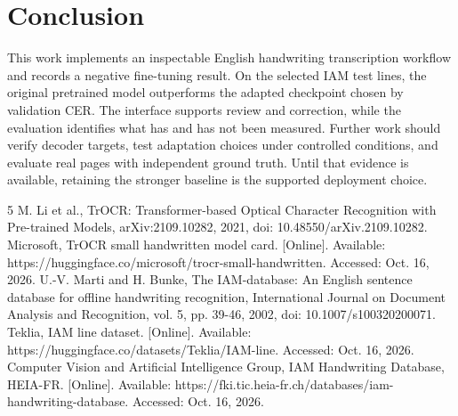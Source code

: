 \documentclass[conference]{IEEEtran}
\begin{document}
\section{Conclusion}
This work implements an inspectable English handwriting transcription workflow and records a negative fine-tuning result. On the selected IAM test lines, the original pretrained model outperforms the adapted checkpoint chosen by validation CER. The interface supports review and correction, while the evaluation identifies what has and has not been measured. Further work should verify decoder targets, test adaptation choices under controlled conditions, and evaluate real pages with independent ground truth. Until that evidence is available, retaining the stronger baseline is the supported deployment choice.
\begin{thebibliography}{5}
 M. Li et al., TrOCR: Transformer-based Optical Character Recognition with Pre-trained Models, arXiv:2109.10282, 2021, doi: 10.48550/arXiv.2109.10282.
 Microsoft, TrOCR small handwritten model card. [Online]. Available: https://huggingface.co/microsoft/trocr-small-handwritten. Accessed: Oct. 16, 2026.
 U.-V. Marti and H. Bunke, The IAM-database: An English sentence database for offline handwriting recognition, International Journal on Document Analysis and Recognition, vol. 5, pp. 39-46, 2002, doi: 10.1007/s100320200071.
 Teklia, IAM line dataset. [Online]. Available: https://huggingface.co/datasets/Teklia/IAM-line. Accessed: Oct. 16, 2026.
 Computer Vision and Artificial Intelligence Group, IAM Handwriting Database, HEIA-FR. [Online]. Available: https://fki.tic.heia-fr.ch/databases/iam-handwriting-database. Accessed: Oct. 16, 2026.
\end{thebibliography}
\end{document}

